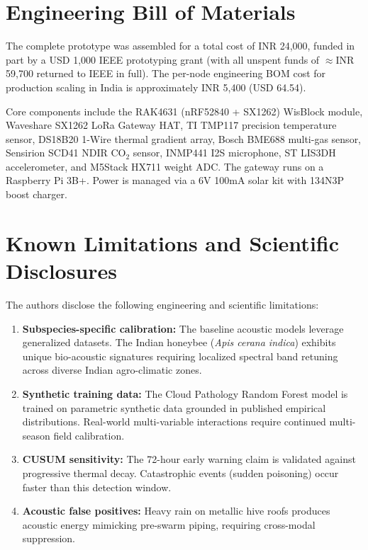 \documentclass[12pt,a4paper]{article}
\begin{document}
\section{Engineering Bill of Materials}

The complete prototype was assembled for a total cost of INR 24,000, funded in part by a USD 1,000 IEEE prototyping grant (with all unspent funds of $\approx$INR 59,700 returned to IEEE in full). The per-node engineering BOM cost for production scaling in India is approximately INR 5,400 (USD 64.54).

Core components include the RAK4631 (nRF52840 + SX1262) WisBlock module, Waveshare SX1262 LoRa Gateway HAT, TI TMP117 precision temperature sensor, DS18B20 1-Wire thermal gradient array, Bosch BME688 multi-gas sensor, Sensirion SCD41 NDIR CO$_2$ sensor, INMP441 I2S microphone, ST LIS3DH accelerometer, and M5Stack HX711 weight ADC. The gateway runs on a Raspberry Pi 3B+. Power is managed via a 6V 100mA solar kit with 134N3P boost charger.

\section{Known Limitations and Scientific Disclosures}

The authors disclose the following engineering and scientific limitations:

\begin{enumerate}[leftmargin=2em, itemsep=1pt, topsep=1pt, parsep=0pt]
    \item \textbf{Subspecies-specific calibration:} The baseline acoustic models leverage generalized datasets. The Indian honeybee (\textit{Apis cerana indica}) exhibits unique bio-acoustic signatures requiring localized spectral band retuning across diverse Indian agro-climatic zones.
    \item \textbf{Synthetic training data:} The Cloud Pathology Random Forest model is trained on parametric synthetic data grounded in published empirical distributions. Real-world multi-variable interactions require continued multi-season field calibration.
    \item \textbf{CUSUM sensitivity:} The 72-hour early warning claim is validated against progressive thermal decay. Catastrophic events (sudden poisoning) occur faster than this detection window.
    \item \textbf{Acoustic false positives:} Heavy rain on metallic hive roofs produces acoustic energy mimicking pre-swarm piping, requiring cross-modal suppression.
\end{enumerate}
\end{document}
